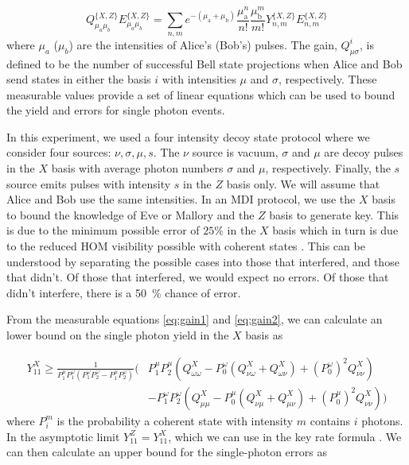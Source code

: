 \begin{equation}
	\label{eq:gain2}
	Q^{\{X, Z\}}_{\mu_{a} \mu_{b}} E^{\{X, Z\}}_{\mu_{a} \mu_{b}}=\sum_{n, m} e^{-\left(\mu_{\mathrm{a}}+\mu_{\mathrm{b}}\right)} \frac{\mu_{\mathrm{a}}^{n}}{n !} \frac{\mu_{\mathrm{b}}^{m}}{m !} Y^{\{X, Z\}}_{n, m} E^{\{X, Z\}}_{n, m}
\end{equation}
where $\mu_a$ ($\mu_b$) are the intensities of Alice's (Bob's) pulses. The gain, $Q_{\mu\sigma}^i$, is defined to be the number of successful Bell state projections when Alice and Bob send states in either the basis $i$ with intensities $\mu$ and $\sigma$, respectively. These measurable values provide a set of linear equations which can be used to bound the yield and errors for single photon events.

In this experiment, we used a four intensity decoy state protocol \cite{zhou2016} where we consider four sources: $\nu, \sigma, \mu, s$. The $\nu$ source is vacuum, $\sigma$ and $\mu$ are decoy pulses in the $X$ basis with average photon numbers $\sigma$ and $\mu$, respectively. Finally, the $s$ source emits pulses with intensity $s$ in the $Z$ basis only. We will assume that Alice and Bob use the same intensities. In an \ac{MDI} protocol, we use the $X$ basis to bound the knowledge of Eve or Mallory and the $Z$ basis to generate key. This is due to the minimum possible error of $25\%$ in the $X$ basis \cite{Rubenok2013} which in turn is due to the reduced \ac{HOM} visibility possible with coherent states \cite{Rarity2005}. This can be understood by separating the possible cases into those that interfered, and those that didn't. Of those that interfered, we would expect no errors. Of those that didn't interfere, there is a \SI{50}{\percent} chance of error. 

From the measurable equations \ref{eq:gain1} and \ref{eq:gain2}, we can calculate an lower bound on the single photon yield in the $X$ basis as

\begin{equation}
	\begin{split}
	Y^X_{11} \ge \frac{1}{P^\mu_1 P^\omega_1 ( P^\omega_1  P^\omega_2 - P^\mu_1 P^\omega_2)} \Big(&P^\mu_1 P^\mu_2 (Q_{\omega\omega}^{X} - P^\omega_0 ( Q_{\nu\omega}^X + Q_{\omega\nu}^X) + (P^\omega_0)^2 Q_{\nu\nu}^X) \\
	&- P^\omega_1 P^\omega_2(Q_{\mu\mu}^{X} - P^\mu_0 ( Q_{\nu\mu}^X + Q_{\mu\nu}^X) + (P^\mu_0)^2 Q_{\nu\nu}^X)\Big)
	\end{split}
\end{equation}
where $P_i^m$ is the probability a coherent state with intensity $m$ contains $i$ photons. In the asymptotic limit $Y^Z_{11} =  Y^X_{11}$, which we can use in the key rate formula \cite{Wang2019asymmetric}. We can then calculate an upper bound for the single-photon errors as 

